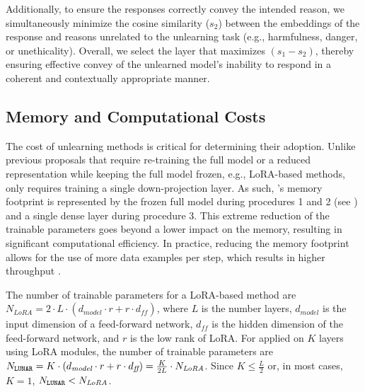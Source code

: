 Additionally, to ensure the responses correctly convey the intended reason, we simultaneously minimize the cosine similarity ($s_2$) between the embeddings of the response and reasons unrelated to the unlearning task (e.g., harmfulness, danger, or unethicality). Overall, we select the layer that maximizes $(s_1 - s_2)$, thereby ensuring effective convey of the unlearned model's inability to respond in a coherent and contextually appropriate manner.





\subsection{Memory and Computational Costs} \label{sec:method_computational_costs}
The cost of unlearning methods is critical for determining their adoption.
Unlike previous proposals that require re-training the full model or a reduced representation while keeping the full model frozen, e.g., LoRA-based methods, \lunar only requires training a single down-projection layer.
As such, \lunar's memory footprint is represented by the frozen full model during procedures 1 and 2 (see ) and a single dense layer during procedure 3.
This extreme reduction of the trainable parameters goes beyond a lower impact on the memory, resulting in significant computational efficiency.
In practice, reducing the memory footprint allows for the use of more data examples per step, which results in higher throughput \citep{mao2024surveylora}.

The number of trainable parameters for a LoRA-based method are $N_{\textit{LoRA}} = 2 \cdot L \cdot (d_{\textit{model}} \cdot r + r \cdot d_{\textit{ff}})$, where $L$ is the number layers, $d_{model}$ is the input dimension of a feed-forward network, $d_{ff}$ is the hidden dimension of the feed-forward network, and $r$ is the low rank of LoRA.
For \lunar applied on $K$ layers using LoRA modules, the number of trainable parameters are $N_{\text{\texttt{LUNAR}}} = K \cdot (d_{\textit{model}} \cdot r + r \cdot d_{\textit{ff}}) = \frac{K}{2L} \cdot N_{\textit{LoRA}}$.
Since $K \leq \frac{L}{2}$ or, in most cases, $K = 1$, $N_{\text{\texttt{LUNAR}}} < N_{\textit{LoRA}}$.

